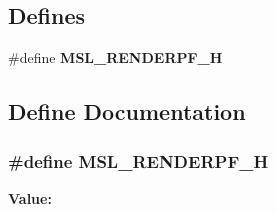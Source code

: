 \subsection*{Defines}
\begin{CompactItemize}
\item 
\#define {\bf MSL\_\-RENDERPF\_\-H}
\end{CompactItemize}


\subsection{Define Documentation}
\subsubsection{\setlength{\rightskip}{0pt plus 5cm}\#define MSL\_\-RENDERPF\_\-H}\label{renderpf_8h_a0}


{\bf Value:}\footnotesize\begin{verbatim}
\end{verbatim}\normalsize 
